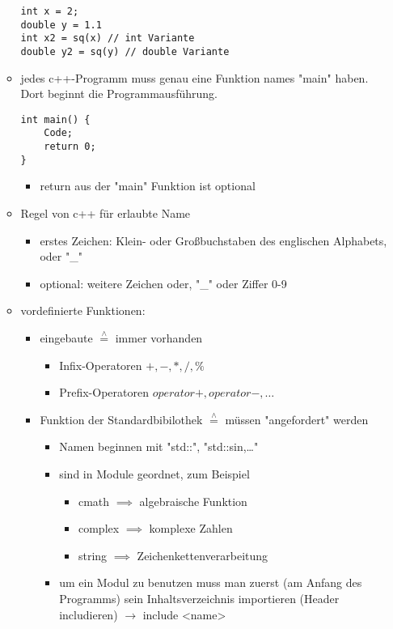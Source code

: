 \documentclass[a4paper]{scrartcl}
\newcommand{\estimates}{\overset{\scriptscriptstyle\wedge}{=}}%
\begin{document}
\begin{itemize}
\begin{itemize}
\begin{verbatim}
int x = 2;
double y = 1.1
int x2 = sq(x) // int Variante
double y2 = sq(y) // double Variante
\end{verbatim}
\item jedes c++-Programm muss genau eine Funktion names "main" haben. Dort beginnt die Programmausführung.
\begin{verbatim}
int main() {
	Code;
	return 0;
}
\end{verbatim}
\begin{itemize}
\item return aus der "main" Funktion ist optional
\end{itemize}
\item Regel von c++ für erlaubte Name
\begin{itemize}
\item erstes Zeichen: Klein- oder Großbuchstaben des englischen Alphabets, oder "\_"
\item optional: weitere Zeichen oder, "\_" oder Ziffer 0-9
\end{itemize}
\item vordefinierte Funktionen:
\begin{itemize}
\item eingebaute $\estimates$ immer vorhanden
\begin{itemize}
\item Infix-Operatoren $+,-,*,/,\%$
\item Prefix-Operatoren $operator+,operator-,\ldots$
\end{itemize}
\item Funktion der Standardbibilothek $\estimates$ müssen "angefordert" werden
\begin{itemize}
\item Namen beginnen mit "std::", "std::sin,\ldots{}"
\item sind in Module geordnet, zum Beispiel
\begin{itemize}
\item cmath $\implies$ algebraische Funktion
\item complex $\implies$ komplexe Zahlen
\item string $\implies$ Zeichenkettenverarbeitung
\end{itemize}
\item um ein Modul zu benutzen muss man zuerst (am Anfang des Programms) sein Inhaltsverzeichnis importieren (Header includieren) $\rightarrow$ include <name>
\begin{verbatim}

\end{verbatim}
\end{itemize}
\end{itemize}
\end{itemize}
\end{itemize}
\end{document}
